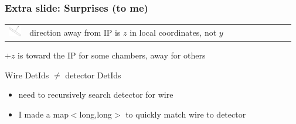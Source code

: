 \documentclass[12pt,compress]{beamer}
\begin{document}
\begin{frame}
\frametitle{Extra slide: Surprises (to me)}

\begin{tabular}{p{0.07\linewidth} p{0.9\linewidth}}
  \begin{minipage}{\linewidth}
    \includegraphics[width=\linewidth]{local_coordinates}
  \end{minipage} &
  \begin{minipage}{\linewidth}
    direction away from IP is $z$ in local coordinates, not $y$
  \end{minipage}
\end{tabular}

\vfill
$+z$ is toward the IP for some chambers, away for others

\vfill
Wire DetIds $\neq$ detector DetIds
\begin{itemize}
\item need to recursively search detector for wire
\item I made a map$<$long,long$>$ to quickly match wire to detector
\end{itemize}
\end{frame}
\end{document}

